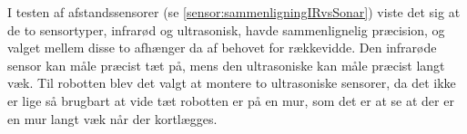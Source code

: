 I testen af afstandssensorer (se \cref{sensor:sammenligningIRvsSonar}) viste det sig at de to sensortyper, infrarød og ultrasonisk, havde sammenlignelig præcision, og valget mellem disse to afhænger da af behovet for rækkevidde. 
Den infrarøde sensor kan måle præcist tæt på, mens den ultrasoniske kan måle præcist langt væk.
Til robotten blev det valgt at montere to ultrasoniske sensorer, da det ikke er lige så brugbart at vide tæt robotten er på en mur, som det er at se at der er en mur langt væk når der kortlægges.
